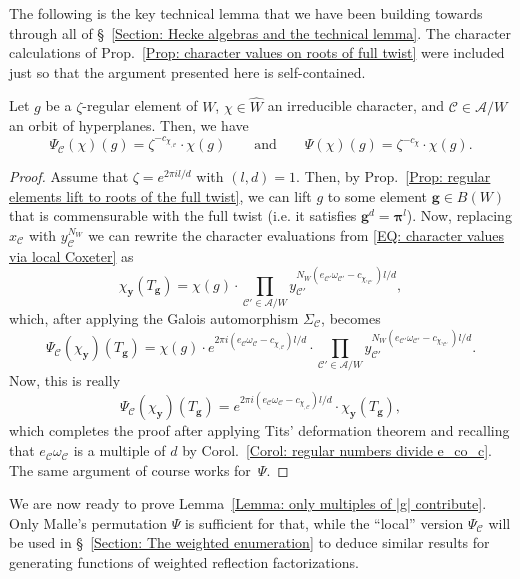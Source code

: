 \documentclass[ALCO, Unicode]{cedram}
\begin{document}
The following is the key technical lemma that we have been building towards through all of \S~\ref{Section: Hecke algebras and the technical lemma}. The character calculations of Prop.~\ref{Prop: character values on roots of full twist} were included just so that the argument presented here is self-contained.

\begin{prop}\label{Prop: The key technical lemma}
Let $g$ be a $\zeta$-regular element of $W$, $\chi\in\widehat{W}$ an irreducible character, and $\mathcal{C}\in\mathcal{A}/W$ an orbit of hyperplanes. Then, we have $$\Psi_{\mathcal{C}}(\chi)(g)= \zeta^{-c_{\chi_{,\mathcal{C}}}}\cdot\chi(g) \quad \quad\text{and}\quad\quad\Psi(\chi)(g)= \zeta^{-c_{\chi}}\cdot \chi(g).$$
\end{prop}
\begin{proof}
Assume that $\zeta=e^{2\pi il/d}$ with $(l,d)=1$. Then, by Prop.~\ref{Prop: regular elements lift to roots of the full twist}, we can lift  $g$ to some element $\bm g\in B(W)$ that is commensurable with the full twist (i.e. it satisfies $\bm g^d=\bm \pi^l$). Now, replacing $x_\mathcal{C}$ with $y_{\mathcal{C}}^{N_W}$ we can rewrite the character evaluations from \eqref{EQ: character values via local Coxeter} as $$\chi_{\bm y}(T_{\bm g})=\chi(g)\cdot\prod_{\mathcal{C}'\in\mathcal{A}/W}y_{\mathcal{C}'}^{N_W(e_{\mathcal{C}'}\omega_{\mathcal{C}'}-c_{\chi,_{\mathcal{C}'}})l/d}, $$
which, after applying the Galois automorphism $\Sigma_{\mathcal{C}}$, becomes
$$ \Psi_{\mathcal{C}}(\chi_{\bm y})(T_{\bm g})= \chi(g)\cdot e^{2\pi i(e_{\mathcal{C}}\omega_{\mathcal{C}}-c_{\chi_{,\mathcal{C}}})l/d }\cdot \prod_{\mathcal{C}'\in\mathcal{A}/W}y_{\mathcal{C}'}^{N_W(e_{\mathcal{C}'}\omega_{\mathcal{C}'}-c_{\chi,_{\mathcal{C}'}})l/d}. $$ 
Now, this is really 
$$ \Psi_{\mathcal{C}}(\chi_{\bm y})(T_{\bm g})=e^{2\pi i(e_{\mathcal{C}}\omega_{\mathcal{C}}-c_{\chi_{,\mathcal{C}}})l/d }\cdot\chi_{\bm y}(T_{\bm g}),$$ which completes the proof after applying Tits' deformation theorem and recalling that $e_{\mathcal{C}}\omega_{\mathcal{C}}$ is a multiple of $d$ by Corol.~\ref{Corol: regular numbers divide e_co_c}. The same argument of course works for~$\Psi$.
\end{proof}

We are now ready to prove Lemma~\ref{Lemma: only multiples of |g| contribute}. Only Malle's permutation $\Psi$ is sufficient for that, while the ``local'' version $\Psi_{\mathcal{C}}$ will be used in \S~\ref{Section: The weighted enumeration} to deduce similar results for generating functions of  weighted reflection factorizations. 
\end{document}
